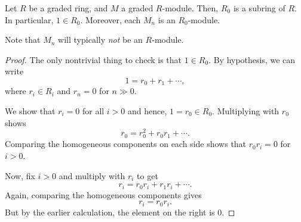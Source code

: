 \documentclass[12pt]{article}
\begin{document}
\begin{prop}
	Let $R$ be a graded ring, and $M$ a graded $R$-module. \newline
	Then, $R_{0}$ is a subring of $R$. In particular, $1 \in R_{0}$. \newline
	Moreover, each $M_{n}$ is an $R_{0}$-module.
\end{prop}
Note that $M_{n}$ will typically \emph{not} be an $R$-module.
\begin{proof} 
	The only nontrivial thing to check is that $1 \in R_{0}$. By hypothesis, we can write
	\begin{equation} \label{eq:001}
		1 = r_{0} + r_{1} + \cdots,
	\end{equation}
	where $r_{i} \in R_{i}$ and $r_{n} = 0$ for $n \gg 0$.

	We show that $r_{i} = 0$ for all $i > 0$ and hence, $1 = r_{0} \in R_{0}$. \newline
	Multiplying  with $r_{0}$ shows
	\begin{equation*} 
		r_{0} = r_{0}^{2} + r_{0}r_{1} + \cdots .
	\end{equation*}
	Comparing the homogeneous components on each side shows that $r_{0} r_{i} = 0$ for $i > 0$. \newline

	Now, fix $i > 0$ and multiply  with $r_{i}$ to get
	\begin{equation*} 
		r_{i} = r_{0} r_{i} + r_{1} r_{i} + \cdots.
	\end{equation*}
	Again, comparing the homogeneous components gives
	\begin{equation*} 
		r_{i} = r_{0} r_{i}.
	\end{equation*}
	But by the earlier calculation, the element on the right is $0$. 
\end{proof}
\end{document}
